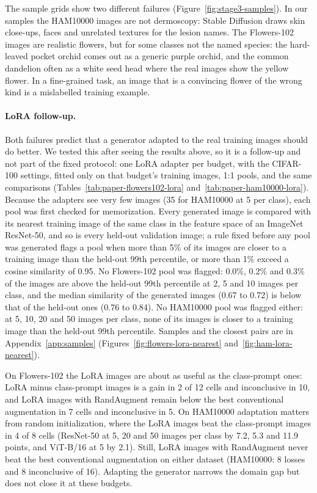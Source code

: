 The sample grids show two different failures (Figure~\ref{fig:stage3-samples}). In our samples the HAM10000 images
are not dermoscopy: Stable Diffusion draws skin close-ups, faces and unrelated textures for the lesion names. The
Flowers-102 images are realistic flowers, but for some classes not the named species: the hard-leaved pocket
orchid comes out as a generic purple orchid, and the common dandelion often as a white seed head where the real
images show the yellow flower. In a fine-grained task, an image that is a convincing flower of the wrong kind
is a mislabelled training example.

\paragraph{LoRA follow-up.}
Both failures predict that a generator adapted to the real training images should do better. We tested this
after seeing the results above, so it is a follow-up and not part of the fixed protocol: one LoRA adapter per
budget, with the CIFAR-100 settings, fitted only on that budget's training images, 1:1 pools, and the same
comparisons (Tables~\ref{tab:paper-flowers102-lora} and~\ref{tab:paper-ham10000-lora}).
Because the adapters see very few images (35 for HAM10000 at 5 per class), each pool was first checked for
memorization. Every generated image is compared with its nearest training image of the same class in the
feature space of an ImageNet ResNet-50, and so is every held-out validation image; a rule fixed before any
pool was generated flags a pool when more than 5\% of its images are closer to a training image than the
held-out 99th percentile, or more than 1\% exceed a cosine similarity of 0.95. No Flowers-102 pool was flagged:
0.0\%, 0.2\% and 0.3\% of the images are above the held-out 99th percentile at 2, 5 and 10 images per class, and
the median similarity of the generated images (0.67 to 0.72) is below that of the held-out ones (0.76 to 0.84).
No HAM10000 pool was flagged either: at 5, 10, 20 and 50 images per class, none of its images is closer to a
training image than the held-out 99th percentile. Samples and the closest pairs are in
Appendix~\ref{app:samples} (Figures~\ref{fig:flowers-lora-nearest} and~\ref{fig:ham-lora-nearest}).

On Flowers-102 the LoRA images are about as useful as the class-prompt ones: LoRA minus class-prompt images is a
gain in 2 of 12 cells and inconclusive in 10, and LoRA images with RandAugment remain below the best
conventional augmentation in 7 cells and inconclusive in 5. On HAM10000 adaptation matters from random
initialization, where the LoRA images beat the class-prompt images in 4 of 8 cells (ResNet-50 at 5, 20 and 50
images per class by 7.2, 5.3 and 11.9 points, and ViT-B/16 at 5 by 2.1). Still, LoRA images with RandAugment
never beat the best conventional augmentation on either dataset (HAM10000: 8 losses and 8 inconclusive of 16).
Adapting the generator narrows the domain gap but does not close it at these budgets.

